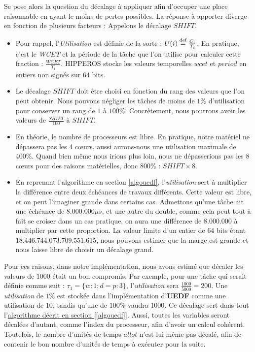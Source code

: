 		Se pose alors la question du décalage à appliquer afin d'occuper une place raisonnable en ayant 
		le moins de pertes possibles.  
		La réponse à apporter diverge en fonction de plusieurs facteurs :
		Appelons le décalage $SHIFT$.
		\begin{itemize}
			\setlength\itemsep{0.1em}
			\item Pour rappel, l'\textit{Utilisation} est définie de la sorte : $U(i) \stackrel{\text{def}}{=} \frac{C_i}{T_i}$. 
			En pratique, c'est le \textit{WCET} et la période de la tâche que l'on utilise pour calculer cette fraction : 
			$\frac{WCET}{T_i}$.
			HIPPEROS stocke les valeurs temporelles $wcet$ et $period$ en entiers non signés sur $64$ bits.
			
			\item Le décalage $SHIFT$ doit être choisi en fonction du rang des valeurs que l'on peut obtenir.
			Nous pouvons négliger les tâches de moins de $1 \%$ d'utilisation pour conserver un rang de $1$ à $100\%$.
			Concrètement, nous pourrons avoir les valeurs de $\frac{SHIFT}{100}$ à $SHIFT$.
			\item En théorie, le nombre de processeurs est libre. En pratique, 
			notre matériel ne dépassera pas les 4 cœurs, aussi aurons-nous une utilisation maximale de $400\%$.
			Quand bien même nous irions plus loin, nous ne dépasserions pas les 8 cœurs pour des raisons 
			matérielles, donc 800\% : $SHIFT \times 8$.
			\item En reprenant l'algorithme en section \ref{algouedf}, 
			l'\textit{utilisation} sert à multiplier la différence entre deux échéances de travaux différents.
			Cette valeur est libre, et on peut l'imaginer grande dans certains cas. 
			Admettons qu'une tâche ait une échéance de $8.000.000 \mu s$, et une autre du double, comme cela 
			peut tout à fait se croiser dans un cas pratique, on aura une différence de $8.000.000$ à multiplier
			par cette proportion. 
			La valeur limite d'un entier de $64$ bits étant $18.446.744.073.709.551.615$, nous pouvons estimer que la marge 
			est grande et nous laisse libre de choisir un décalage grand.
		\end{itemize}
		Pour ces raisons, dans notre implémentation, nous avons estimé que décaler les valeurs de $1000$ était un bon compromis.
		Par exemple, pour une tâche qui serait définie comme suit : $\tau_1 = \{w:1; d=p : 3\}$, 
		l'\textit{utilisation} sera $\frac{1000}{5000} = 200$.
		Une \textit{utilisation} de $1\%$ est stockée dans l'implémentation d'\textbf{UEDF} comme une utilisation de 
		$10$, tandis qu'une de $100\%$ vaudra $1000$. Ce décalage sert dans tout l'\hyperref[algouedf]{algorithme décrit en section [\ref*{algouedf}]}.
		Aussi, toutes les variables seront décalées d'autant, comme l'index du processeur, afin d'avoir un calcul cohérent. 
		Toutefois, le nombre d'unités de temps $allot$ 
		n'est lui-même pas décalé, afin de contenir le bon nombre d'unités de temps à exécuter pour la suite.		
		
